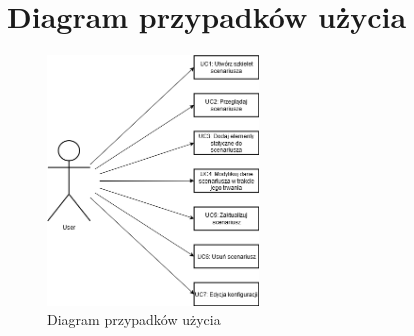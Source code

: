 \section{Diagram przypadków użycia}
\begin{figure}[h!]
    \centering
    \includegraphics[width=0.5\textwidth]{resources/local/use-case-diagram-2.png}
    \caption{Diagram przypadków użycia}
    \label{fig:use_case_diagram}
\end{figure}

